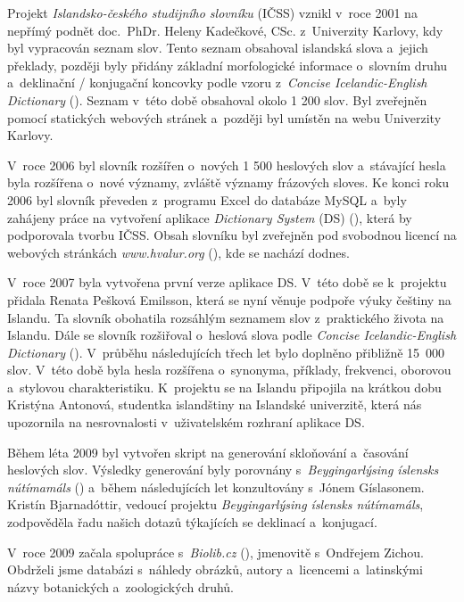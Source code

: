 Projekt \textit{Islandsko-českého studijního slovníku} (IČSS) vznikl v~roce 2001 na nepřímý podnět doc. PhDr. Heleny Kadečkové, CSc. z~Univerzity Karlovy,
kdy byl vypracován seznam slov. 
Tento seznam obsahoval islandská slova a~jejich překlady, později byly přidány základní morfologické informace o~slovním druhu a~deklinační / konjugační koncovky podle vzoru z~\textit{Concise Icelandic-English Dictionary} (\cite {ic_en}). 
Seznam v~této době obsahoval okolo 1 200 slov. Byl zveřejněn pomocí statických webových stránek a~později byl umístěn na webu Univerzity Karlovy. 

V~roce 2006 byl slovník rozšířen o~nových 1 500 heslových slov a~stávající hesla byla rozšířena o~nové významy, zvláště významy frázových sloves. 
Ke konci roku 2006  byl slovník převeden z programu Excel do databáze MySQL a~byly zahájeny práce na vytvoření aplikace \textit{Dictionary System} (DS) (\cite {int19}), která by podporovala tvorbu IČSS. 
Obsah slovníku byl zveřejněn pod svobodnou licencí na webových stránkách \textit{www.hvalur.org} (\cite {int14}), kde se nachází dodnes. 

V~roce 2007 byla vytvořena první verze aplikace DS. V~této době se k~projektu přidala Renata Pešková Emilsson, která se nyní věnuje podpoře výuky češtiny na Islandu. 
Ta slovník obohatila rozsáhlým seznamem slov z~praktického života na Islandu. Dále se slovník rozšiřoval o~heslová slova podle \textit{Concise Icelandic-English Dictionary} (\cite {ic_en}). 
V průběhu následujících třech let bylo doplněno přibližně 15~000 slov. V této době byla hesla rozšířena o~synonyma, příklady, frekvenci, oborovou a~stylovou charakteristiku. K projektu se na Islandu připojila na krátkou dobu Kristýna Antonová, studentka islandštiny na Islandské univerzitě, která 
nás upozornila na nesrovnalosti v~uživatelském rozhraní aplikace DS.

Během léta 2009 byl vytvořen skript na generování skloňování a~časování heslových slov. Výsledky generování byly porovnány s~\textit{Beygingarlýsing íslensks nútímamáls} (\cite {DalvikVM}) a~během následujících let konzultovány
s~Jónem Gíslasonem. Kristín Bjarnadóttir, vedoucí projektu \textit{Beygingarlýsing íslensks nútímamáls}, zodpověděla řadu našich dotazů týkajících se deklinací a~konjugací.

V~roce 2009 začala spolupráce s~\textit{Biolib.cz} (\cite {int5}), jmenovitě s~Ondřejem Zichou. Obdrželi jsme  databázi s~náhledy obrázků, autory a~licencemi a~latinskými názvy botanických a~zoologických druhů.

